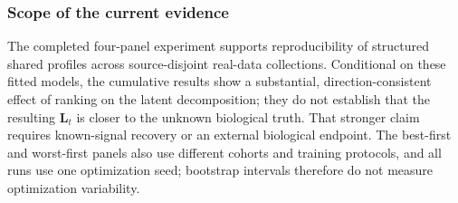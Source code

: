\subsubsection{Scope of the current evidence}

The completed four-panel experiment supports reproducibility of structured
shared profiles across source-disjoint real-data collections.  Conditional on
these fitted models, the cumulative results show a substantial,
direction-consistent effect of ranking on the latent decomposition; they do not
establish that the resulting $\mathbf{L}_t$ is closer to the unknown biological
truth.  That stronger claim requires known-signal recovery or an external
biological endpoint.  The best-first and worst-first panels also use different
cohorts and training protocols, and all runs use one optimization seed;
bootstrap intervals therefore do not measure optimization variability.

